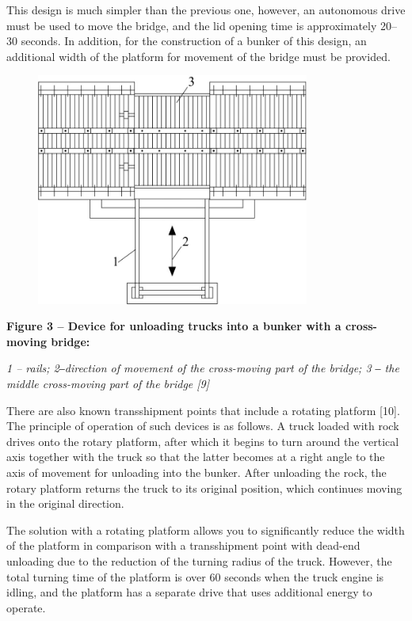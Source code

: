 This design is much simpler than the previous one, however, an
autonomous drive must be used to move the bridge, and the lid opening
time is approximately 20--30 seconds. In addition, for the construction
of a bunker of this design, an additional width of the platform for
movement of the bridge must be provided.

\begin{figure}[H]
	\centering
	\includegraphics[width=0.8\textwidth]{assets/1352}
	\caption*{}
\end{figure}

{\bfseries Figure 3 -- Device for unloading trucks into a bunker with a
cross-moving bridge:}

\emph{1 -- rails; 2‒direction of movement of the cross-moving part of
the bridge; 3 ‒ the middle cross-moving part of the bridge {[}9{]}}

There are also known transshipment points that include a rotating
platform {[}10{]}. The principle of operation of such devices is as
follows. A truck loaded with rock drives onto the rotary platform, after
which it begins to turn around the vertical axis together with the truck
so that the latter becomes at a right angle to the axis of movement for
unloading into the bunker. After unloading the rock, the rotary platform
returns the truck to its original position, which continues moving in
the original direction.

The solution with a rotating platform allows you to significantly reduce
the width of the platform in comparison with a transshipment point with
dead-end unloading due to the reduction of the turning radius of the
truck. However, the total turning time of the platform is over 60
seconds when the truck engine is idling, and the platform has a separate
drive that uses additional energy to operate.

